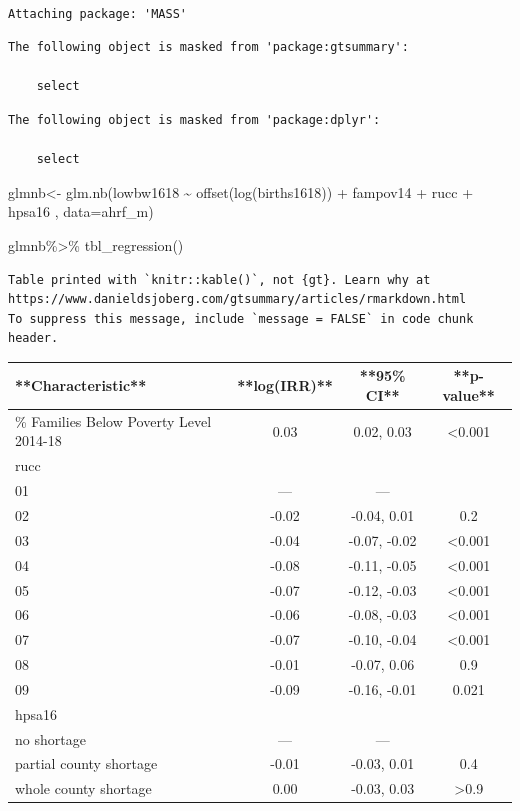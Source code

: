\documentclass[
  letterpaper,
  DIV=11,
  numbers=noendperiod]{scrreprt}
\newenvironment{Shaded}{\begin{snugshade}}{\end{snugshade}}
\newcommand{\AttributeTok}[1]{\textcolor[rgb]{0.40,0.45,0.13}{#1}}
\newcommand{\FunctionTok}[1]{\textcolor[rgb]{0.28,0.35,0.67}{#1}}
\newcommand{\NormalTok}[1]{\textcolor[rgb]{0.00,0.23,0.31}{#1}}
\newcommand{\OtherTok}[1]{\textcolor[rgb]{0.00,0.23,0.31}{#1}}
\newcommand{\SpecialCharTok}[1]{\textcolor[rgb]{0.37,0.37,0.37}{#1}}
\begin{document}
\begin{verbatim}

Attaching package: 'MASS'
\end{verbatim}

\begin{verbatim}
The following object is masked from 'package:gtsummary':

    select
\end{verbatim}

\begin{verbatim}
The following object is masked from 'package:dplyr':

    select
\end{verbatim}

\begin{Shaded}
\begin{Highlighting}[]
\NormalTok{glmnb}\OtherTok{\textless{}{-}} \FunctionTok{glm.nb}\NormalTok{(lowbw1618 }\SpecialCharTok{\textasciitilde{}} \FunctionTok{offset}\NormalTok{(}\FunctionTok{log}\NormalTok{(births1618)) }\SpecialCharTok{+}\NormalTok{ fampov14 }\SpecialCharTok{+}\NormalTok{ rucc }\SpecialCharTok{+}\NormalTok{ hpsa16 ,}
               \AttributeTok{data=}\NormalTok{ahrf\_m)}


\NormalTok{glmnb}\SpecialCharTok{\%\textgreater{}\%}
  \FunctionTok{tbl\_regression}\NormalTok{()}
\end{Highlighting}
\end{Shaded}

\begin{verbatim}
Table printed with `knitr::kable()`, not {gt}. Learn why at
https://www.danieldsjoberg.com/gtsummary/articles/rmarkdown.html
To suppress this message, include `message = FALSE` in code chunk header.
\end{verbatim}

\begin{tabular}{l|c|c|c}
\hline
**Characteristic** & **log(IRR)** & **95\% CI** & **p-value**\\
\hline
\% Families Below Poverty Level 2014-18 & 0.03 & 0.02, 0.03 & <0.001\\
\hline
rucc &  &  & \\
\hline
01 & — & — & \\
\hline
02 & -0.02 & -0.04, 0.01 & 0.2\\
\hline
03 & -0.04 & -0.07, -0.02 & <0.001\\
\hline
04 & -0.08 & -0.11, -0.05 & <0.001\\
\hline
05 & -0.07 & -0.12, -0.03 & <0.001\\
\hline
06 & -0.06 & -0.08, -0.03 & <0.001\\
\hline
07 & -0.07 & -0.10, -0.04 & <0.001\\
\hline
08 & -0.01 & -0.07, 0.06 & 0.9\\
\hline
09 & -0.09 & -0.16, -0.01 & 0.021\\
\hline
hpsa16 &  &  & \\
\hline
no shortage & — & — & \\
\hline
partial county shortage & -0.01 & -0.03, 0.01 & 0.4\\
\hline
whole county shortage & 0.00 & -0.03, 0.03 & >0.9\\
\hline
\end{tabular}
\end{document}

